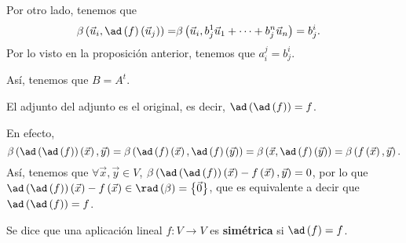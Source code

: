 Por otro lado, tenemos que
\[
\begin{split}
	\beta\left(\vec{u}_{i}, \ad\left(f\right)\left(\vec{u}_{j}\right)\right) = & \beta\left(\vec{u}_{i}, b^{1}_{j}\vec{u}_{1} + \cdots + b^{n}_{j}\vec{u}_{n}\right) = b^{i}_{j} .
\end{split}
\]
Por lo visto en la proposición anterior, tenemos que $\displaystyle a^{j}_{i} = b^{i}_{j} $.
\begin{observation}
\normalfont Así, tenemos que $\displaystyle B = A^{t} $.
\end{observation}
\begin{observation}
\normalfont El adjunto del adjunto es el original, es decir, $\displaystyle \ad\left(\ad\left(f\right)\right) = f$.
\end{observation}
En efecto, 
\[ \beta\left(\ad\left(\ad\left(f\right)\right)\left(\vec{x}\right), \vec{y}\right) = \beta\left(\ad\left(f\right)\left(\vec{x}\right), \ad\left(f\right)\left(\vec{y}\right)\right) =\beta\left(\vec{x}, \ad\left(f\right)\left(\vec{y}\right)\right)= \beta\left(f\left(\vec{x}\right), \vec{y}\right).\]
Así, tenemos que $\displaystyle \forall \vec{x}, \vec{y} \in V $, $\displaystyle \beta\left(\ad\left(\ad\left(f\right)\right)\left(\vec{x}\right) - f\left(\vec{x}\right), \vec{y}\right) = 0 $, por lo que $\displaystyle \ad\left(\ad\left(f\right)\right)\left(\vec{x}\right) - f\left(\vec{x}\right) \in \rad\left(\beta \right)= \left\{ \vec{0}\right\}  $, que es equivalente a decir que $\displaystyle \ad\left(\ad\left(f\right)\right) = f $.
\begin{fdefinition}[]
\normalfont Se dice que una aplicación lineal $\displaystyle f : V \to V $ es \textbf{simétrica} si $\displaystyle \ad\left(f\right) = f $.
\end{fdefinition}
